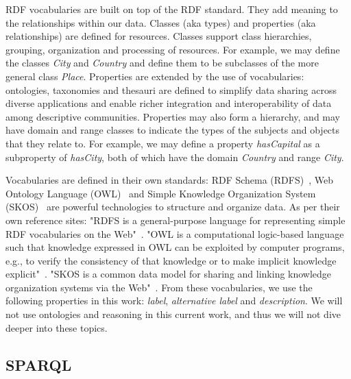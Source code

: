 RDF vocabularies are built on top of the RDF standard. They add meaning to the relationships within our data. Classes (aka types) and properties (aka relationships) are defined for resources. Classes support class hierarchies, grouping, organization and processing of resources. For example, we may define the classes \textit{City} and \textit{Country} and define them to be subclasses of the more general class \textit{Place}. Properties are extended by the use of vocabularies: ontologies, taxonomies and thesauri are defined to simplify data sharing across diverse applications and enable richer integration and interoperability of data among descriptive communities. Properties may also form a hierarchy, and may have domain and range classes to indicate the types of the subjects and objects that they relate to. For example, we may define a property \textit{hasCapital} as a subproperty of \textit{hasCity}, both of which have the domain \textit{Country} and range \textit{City}.

Vocabularies are defined in their own standards: RDF Schema (RDFS)~\cite{RDFS}, Web Ontology Language (OWL)~\cite{OWL} and Simple Knowledge Organization System (SKOS)~\cite{SKOS} are powerful technologies to structure and organize data. As per their own reference sites: "RDFS is a general-purpose language for representing simple RDF vocabularies on the Web"~\cite{RDFS}. "OWL is a computational logic-based language such that knowledge expressed in OWL can be exploited by computer programs, e.g., to verify the consistency of that knowledge or to make implicit knowledge explicit"~\cite{OWL}. "SKOS is a common data model for sharing and linking knowledge organization systems via the Web"~\cite{SKOS}. From these vocabularies, we use the following properties in this work: \textit{label}, \textit{alternative label} and \textit{description}. We will not use ontologies and reasoning in this current work, and thus we will not dive deeper into these topics.


\subsection{SPARQL}
\label{chap:SPARQL}

